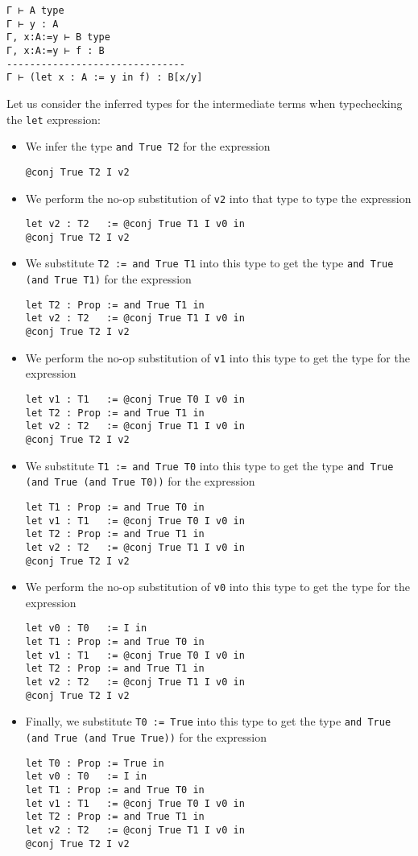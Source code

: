 \begin{verbatim}
Γ ⊢ A type
Γ ⊢ y : A
Γ, x:A:=y ⊢ B type
Γ, x:A:=y ⊢ f : B
-------------------------------
Γ ⊢ (let x : A := y in f) : B[x/y]
\end{verbatim}

Let us consider the inferred types for the intermediate terms when typechecking the \texttt{let} expression:
\begin{itemize}
  \item
  We infer the type \texttt{and True T2} for the expression
\begin{verbatim}
@conj True T2 I v2
\end{verbatim}
  \item
  We perform the no-op substitution of \texttt{v2} into that type to type the expression
\begin{verbatim}
let v2 : T2   := @conj True T1 I v0 in
@conj True T2 I v2
\end{verbatim}
  \item
  We substitute \texttt{T2 := and True T1} into this type to get the type \texttt{and True (and True T1)} for the expression
\begin{verbatim}
let T2 : Prop := and True T1 in
let v2 : T2   := @conj True T1 I v0 in
@conj True T2 I v2
\end{verbatim}
  \item
  We perform the no-op substitution of \texttt{v1} into this type to get the type for the expression
\begin{verbatim}
let v1 : T1   := @conj True T0 I v0 in
let T2 : Prop := and True T1 in
let v2 : T2   := @conj True T1 I v0 in
@conj True T2 I v2
\end{verbatim}
  \item
  We substitute \texttt{T1 := and True T0} into this type to get the type \texttt{and True (and True (and True T0))} for the expression
\begin{verbatim}
let T1 : Prop := and True T0 in
let v1 : T1   := @conj True T0 I v0 in
let T2 : Prop := and True T1 in
let v2 : T2   := @conj True T1 I v0 in
@conj True T2 I v2
\end{verbatim}
  \item
  We perform the no-op substitution of \texttt{v0} into this type to get the type for the expression
\begin{verbatim}
let v0 : T0   := I in
let T1 : Prop := and True T0 in
let v1 : T1   := @conj True T0 I v0 in
let T2 : Prop := and True T1 in
let v2 : T2   := @conj True T1 I v0 in
@conj True T2 I v2
\end{verbatim}
  \item
  Finally, we substitute \texttt{T0 := True} into this type to get the type \texttt{and True (and True (and True True))} for the expression
\begin{verbatim}
let T0 : Prop := True in
let v0 : T0   := I in
let T1 : Prop := and True T0 in
let v1 : T1   := @conj True T0 I v0 in
let T2 : Prop := and True T1 in
let v2 : T2   := @conj True T1 I v0 in
@conj True T2 I v2
\end{verbatim}
\end{itemize}
